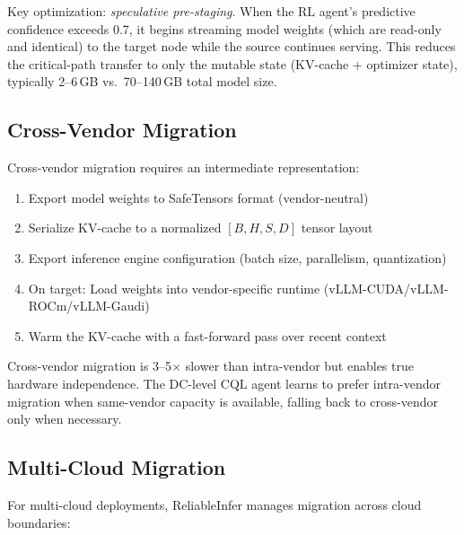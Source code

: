 \documentclass[conference,10pt,letterpaper]{IEEEtran}
\begin{document}
Key optimization: \emph{speculative pre-staging}. When the RL agent's predictive confidence exceeds 0.7, it begins streaming model weights (which are read-only and identical) to the target node while the source continues serving. This reduces the critical-path transfer to only the mutable state (KV-cache + optimizer state), typically 2--6\,GB vs.\ 70--140\,GB total model size.

\subsection{Cross-Vendor Migration}

Cross-vendor migration requires an intermediate representation:

\begin{enumerate}
\item Export model weights to SafeTensors format (vendor-neutral)
\item Serialize KV-cache to a normalized $[B, H, S, D]$ tensor layout
\item Export inference engine configuration (batch size, parallelism, quantization)
\item On target: Load weights into vendor-specific runtime (vLLM-CUDA/vLLM-ROCm/vLLM-Gaudi)
\item Warm the KV-cache with a fast-forward pass over recent context
\end{enumerate}

Cross-vendor migration is 3--5$\times$ slower than intra-vendor but enables true hardware independence. The DC-level CQL agent learns to prefer intra-vendor migration when same-vendor capacity is available, falling back to cross-vendor only when necessary.

\subsection{Multi-Cloud Migration}

For multi-cloud deployments, ReliableInfer manages migration across cloud boundaries:

\begin{table}[!t]
\caption{Multi-Cloud Migration Matrix}
\label{tab:multicloud}
\centering\scriptsize
{}
\end{table}
\end{document}
